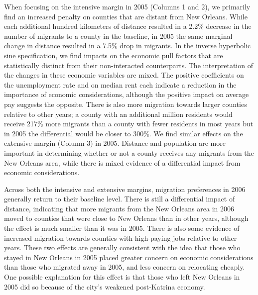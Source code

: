 \documentclass[]{article}
\begin{document}
When focusing on the intensive margin in 2005 (Columns 1 and 2), we
primarily find an increased penalty on counties that are distant from
New Orleans. While each additional hundred kilometers of distance
resulted in a 2.2\% decrease in the number of migrants to a county in
the baseline, in 2005 the same marginal change in distance resulted in a
7.5\% drop in migrants. In the inverse hyperbolic sine specification, we
find impacts on the economic pull factors that are statistically
distinct from their non-interacted counterparts. The interpretation of
the changes in these economic variables are mixed. The positive
coefficients on the unemployment rate and on median rent each indicate a
reduction in the importance of economic considerations, although the
positive impact on average pay suggests the opposite. There is also more
migration towards larger counties relative to other years; a county with
an additional million residents would receive 217\% more migrants than a
county with fewer residents in most years but in 2005 the differential
would be closer to 300\%. We find similar effects on the extensive
margin (Column 3) in 2005. Distance and population are more important in
determining whether or not a county receives any migrants from the New
Orleans area, while there is mixed evidence of a differential impact
from economic considerations.

Across both the intensive and extensive margins, migration preferences
in 2006 generally return to their baseline level. There is still a
differential impact of distance, indicating that more migrants from the
New Orleans area in 2006 moved to counties that were close to New
Orleans than in other years, although the effect is much smaller than it
was in 2005. There is also some evidence of increased migration towards
counties with high-paying jobs relative to other years. These two
effects are generally consistent with the idea that those who stayed in
New Orleans in 2005 placed greater concern on economic considerations
than those who migrated away in 2005, and less concern on relocating
cheaply. One possible explanation for this effect is that those who left
New Orleans in 2005 did so because of the city's weakened post-Katrina
economy.
\end{document}
